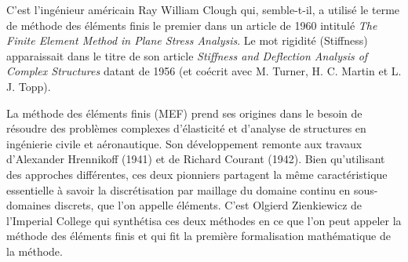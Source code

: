 \medskip
\begin{histoire}%
\ifVersionDuDocEstVincent{}\selectfont\fi
C'est l'ingénieur américain Ray William Clough qui, semble-t-il, a utilisé le terme de méthode des éléments finis le premier dans un article de 1960 intitulé \emph{The Finite Element Method in Plane Stress Analysis}. Le mot rigidité (Stiffness) apparaissait dans le titre de son article \emph{Stiffness and Deflection Analysis of Complex Structures} datant de 1956 (et coécrit avec M. Turner, H. C. Martin et L. J. Topp).

\medskip
{}

\medskip
La méthode des éléments finis (MEF) prend ses origines dans le besoin de résoudre des problèmes complexes d'élasticité et d'analyse de structures en ingénierie civile et aéronautique. Son développement remonte aux travaux d'Alexander Hrennikoff (1941) et de Richard Courant (1942). Bien qu'utilisant des approches différentes, ces deux pionniers partagent la même caractéristique essentielle à savoir la discrétisation par maillage du domaine continu en sous-domaines discrets, que l'on appelle éléments. C'est Olgierd Zienkiewicz de l'Imperial College qui synthétisa ces deux méthodes en ce que l'on peut appeler la méthode des éléments finis et qui fit la première formalisation mathématique de la méthode.


\end{histoire}
